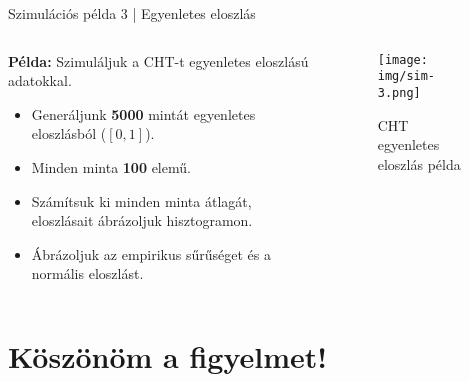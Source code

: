 \documentclass[aspectratio=169,12pt]{beamer}
\begin{document}
	\begin{frame}{Szimulációs példa 3 | Egyenletes eloszlás}
		\begin{columns}
			\begin{column}{0.5\textwidth}
				\textbf{Példa:} Szimuláljuk a CHT-t egyenletes eloszlású adatokkal.
				\begin{itemize}
					\item Generáljunk \textbf{5000} mintát egyenletes eloszlásból (\([0,1]\)).
					\item Minden minta \textbf{100} elemű.
					\item Számítsuk ki minden minta átlagát, eloszlásait ábrázoljuk hisztogramon.
					\item Ábrázoljuk az empirikus sűrűséget és a normális eloszlást.
				\end{itemize}
			\end{column}
			\begin{column}{0.5\textwidth}
				\begin{figure}
					\texttt{[image: img/sim-3.png]}
					\caption{CHT egyenletes eloszlás példa}
				\end{figure}
			\end{column}
		\end{columns}
	\end{frame}
	
	
	\section{Köszönöm a figyelmet!}

	
\end{document}
